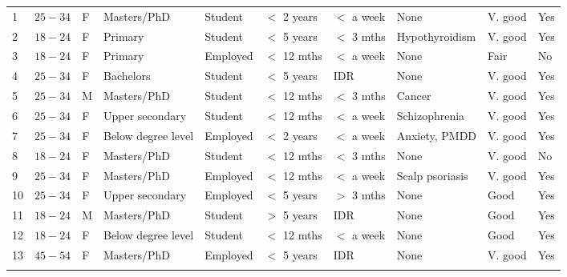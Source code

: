 \begin{table}[t]
\begin{tabular}{p{0.15cm} p{0.75cm} p{0.2cm} p{2cm} p{1.5cm} p{1.15cm} p{1.45cm} p{2cm} p{1.1cm} p{0.25cm}}
    1	&   $25-34$	& F    &   Masters/PhD	            &   Student     &  $<$ 2 years     & $<$ a week	    & None	                 & V. good	    & Yes    \\ \rowcolor[gray]{.95}
    2	&   $18-24$	& F    &   Primary	                &   Student     &  $<$ 5 years     & $<$ 3 mths	    & Hypothyroidism	     & V. good	    & Yes    \\ 
    3	&   $18-24$	& F    &   Primary	                &   Employed    &  $<$ 12 mths     & $<$ a week	    & None	                 & Fair	        & No     \\ \rowcolor[gray]{.95}
    4	&   $25-34$	& F    &   Bachelors	            &   Student     &  $<$ 5 years     & IDR	        & None	                 & V. good	    & Yes    \\ 
    5	&   $25-34$	& M    &   Masters/PhD	            &   Student	    &  $<$ 12 mths     & $<$ 3 mths	    & Cancer	             & V. good	    & Yes    \\ \rowcolor[gray]{.95}
    6	&   $25-34$	& F    &   Upper secondary	        &   Student	    &  $<$ 12 mths     & $<$ a week	    & Schizophrenia	         & V. good	    & Yes    \\ 
    7	&   $25-34$	& F    &   Below degree level	    &   Employed	&  $<$ 2 years     & $<$ a week	    & Anxiety, \acs{PMDD}	 & V. good	    & Yes    \\ \rowcolor[gray]{.95}
    8	&   $18-24$	& F    &   Masters/PhD	            &   Student	    &  $<$ 12 mths     & $<$ 3 mths	    & None	                 & V. good	    & No     \\ 
    9	&   $25-34$	& F    &   Masters/PhD	            &   Employed	&  $<$ 12 mths     & $<$ a week	    & Scalp psoriasis	     & V. good	    & Yes    \\ \rowcolor[gray]{.95}
    10	&   $25-34$	& F    &   Upper secondary	        &   Employed    &  $<$ 5 years     & $>$ 3 mths	    & None	                 & Good         & Yes    \\ 
    11	&   $18-24$	& M    &   Masters/PhD	            &   Student	    &  $>$ 5 years     & IDR	        & None	                 & Good	        & Yes    \\ \rowcolor[gray]{.95}
    12	&   $18-24$	& F    &   Below degree level	    &   Student	    &  $<$ 12 mths     & $<$ a week	    & None	                 & Good	        & Yes    \\ 
    13	&   $45-54$	& F    &   Masters/PhD	            &   Employed    &  $<$ 5 years     & IDR	        & None	                 & V. good	    & Yes    \\ \rowcolor[gray]{.95}

\end{tabular}
\end{table}
